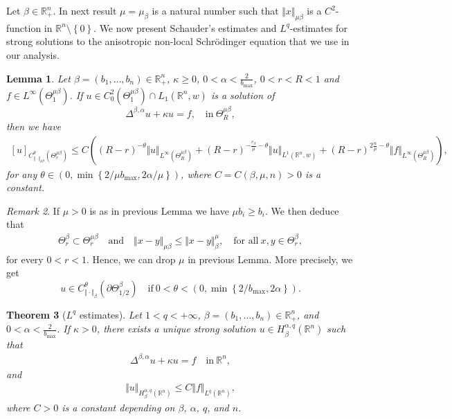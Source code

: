 \documentclass[10pt, leqno]{article}
\newtheorem{theorem}{Theorem}[section]
\newtheorem{lemma}[theorem]{Lemma}
\theoremstyle{definition}
\theoremstyle{remark}
\newtheorem{remark}[theorem]{Remark}
\numberwithin{equation}{section}
\begin{document}
Let $\beta \in \mathbb{R}^{n}_{+}$. In next result $\mu = \mu_{\beta}$ is a natural number such that $\Vert x \Vert_{\mu\beta}$ is a $C^{2}$-function in $\mathbb{R}^{n} \setminus \left\lbrace 0 \right\rbrace$. We now present Schauder's estimates and $L^{q}$-estimates for strong solutions to the anisotropic non-local Schr\" odinger equation that we use in our analysis.

\begin{lemma}
\label{C-regularity in general}
Let $\beta=(b_{1}, \dots, b_{n}) \in \mathbb{R}^{n}_{+}$, $\kappa \geq 0$, $0 < \alpha < \frac{2}{b_{\max}}$, $0 < r < R < 1$ and $f \in L^{\infty}(\Theta^{\mu \beta}_{1})$. If $u \in C^{2}_{0}(\Theta^{\mu \beta}_{1}) \cap L_{1} (\mathbb{R}^{n}, w)$ is a solution of
$$
\Delta^{\beta, \alpha} u + \kappa u = f,  \quad \text{in} \ \Theta^{\mu \beta}_{R},
$$
then we have
\begin{eqnarray*}
\label{C-reg. estimate in general}
\left[ u \right]_{C_{\Vert \cdot \Vert_{\mu \beta}}^{\theta}(\Theta^{\mu \beta}_{r})} \leq C \left( (R - r)^{-\theta} \Vert u \Vert_{L^{\infty}(\Theta^{\mu \beta}_{R})} + (R - r)^{-\frac{c_{\beta}}{\mu}-\theta} \Vert u \Vert_{ L^{1} (\mathbb{R}^{n}, w)} + (R - r)^{2\frac{\alpha}{\mu} - \theta} \Vert f \Vert_{L^{\infty}(\Theta^{\mu \beta}_{R})} \right),
\end{eqnarray*}
for any $\theta \in \left(0, \min \left \lbrace 2/\mu b_{\max}, 2\alpha/\mu \right \rbrace \right)$, where $C=C(\beta, \mu, n) >0$ is a constant.
\end{lemma}

\begin{remark}
\label{C regilarity original norm remark}
If $\mu>0$ is as in previous Lemma we have $\mu b_{i} \geq b_{i}$. We then deduce that
\begin{eqnarray}
\Theta^{\beta}_{r} \subset \Theta^{\mu \beta}_{r} \quad \text{and} \quad \Vert x - y \Vert_{\mu\beta} \leq \Vert x - y \Vert^{\mu}_{\beta}, \quad \text{for all} \ x,y \in \Theta^{\beta}_{r},
\end{eqnarray}
for every $0 < r < 1$. Hence, we can drop $\mu$ in previous Lemma. More precisely, we get
$$
u \in C^{\theta}_{\Vert \cdot \Vert_{\beta}}\left( \partial \Theta^{\beta}_{1/2} \right) \quad \text{if} \ 0 < \theta < \left(0, \min \left \lbrace 2/b_{\max}, 2\alpha \right \rbrace \right).
$$
\end{remark}

\begin{theorem}[$L^{q}$ estimates]
\label{Lq estimates}
Let $1 < q < +\infty$, $\beta = (b_{1}, \dots, b_{n}) \in \mathbb{R}^{n}_{+}$, and $0 < \alpha < \frac{2}{b_{\max}}$. If $\kappa > 0$, there exists a unique strong solution $u \in H_{\beta}^{\alpha,q}(\mathbb{R}^{n})$ such that
\begin{eqnarray}
\Delta^{\beta, \alpha}u + \kappa u = f \quad \text{in} \ \mathbb{R}^{n},
\end{eqnarray}
and
\begin{eqnarray}
\Vert u \Vert_{H_{\beta}^{\alpha, q}(\mathbb{R}^{n})} \leq C \Vert f \Vert_{L^{q}\left( \mathbb{R}^{n}\right)},
\end{eqnarray}
where $C > 0$ is a constant depending on $\beta$, $\alpha$, $q$, and $n$.
\end{theorem}
\end{document}
